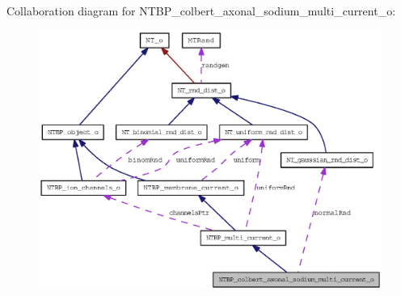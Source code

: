 Collaboration diagram for NTBP\_\-colbert\_\-axonal\_\-sodium\_\-multi\_\-current\_\-o:
\nopagebreak
\begin{figure}[H]
\begin{center}
\leavevmode
\includegraphics[width=400pt]{class_n_t_b_p__colbert__axonal__sodium__multi__current__o__coll__graph}
\end{center}
\end{figure}
